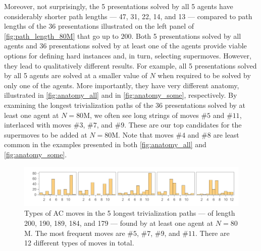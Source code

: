 Moreover, not surprisingly, the 5 presentations solved by all 5 agents have considerably shorter path lengths --- 47, 31, 22, 14, and 13 --- compared to path lengths of the 36 presentations illustrated on the left panel of \autoref{fig:path_length_80M} that go up to $200$. Both 5 presentations solved by all agents and 36 presentations solved by at least one of the agents provide viable options for defining hard instances and, in turn, selecting supermoves. However, they lead to qualitatively different results. For example, all 5 presentations solved by all 5 agents are solved at a smaller value of $N$ when required to be solved by only one of the agents. More importantly, they have very different anatomy, illustrated in \autoref{fig:anatomy_all} and in \autoref{fig:anatomy_some}, respectively.
%
By examining the longest trivialization paths of the 36 presentations solved by at least one agent at $N=80$M, we often see long strings of moves $\# 5$ and $\# 11$, interlaced with moves $\# 3$, $\# 7$, and $\# 9$. These are our top candidates for the supermoves to be added at $N=80$M.
%
Note that moves $\# 4$ and $\# 8$ are least common in the examples presented in both \autoref{fig:anatomy_all} and \autoref{fig:anatomy_some}.

\begin{figure}[h]
    \centering
	\includegraphics[scale=0.6]{fig/anatomy_some.png}
	\caption{Types of AC moves in the 5 longest trivialization paths --- of length 200, 190, 189, 184, and 179 --- found by at least one agent at $N=80$M. The most frequent moves are $\# 5$, $\# 7$, $\# 9$, and $\# 11$. There are 12 different types of moves in total.}
	\label{fig:anatomy_some}
\end{figure}

